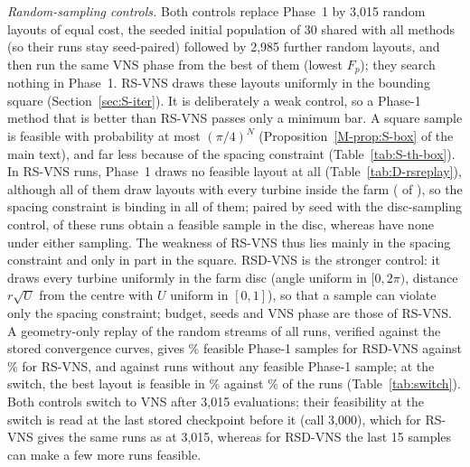 \documentclass[10pt]{article}
\begin{document}
\emph{Random-sampling controls.} Both controls replace Phase~1 by 3,015 random layouts of equal cost, the seeded initial population of 30 shared with all methods (so their runs stay seed-paired) followed by 2,985 further random layouts, and then run the same VNS phase from the best of them (lowest $F_p$); they search nothing in Phase~1. RS-VNS draws these layouts uniformly in the bounding square (Section~\ref{sec:S-iter}). It is deliberately a weak control, so a Phase-1 method that is better than RS-VNS passes only a minimum bar. A square sample is feasible with probability at most $(\pi/4)^N$ (Proposition~\ref{M-prop:S-box} of the main text), and far less because of the spacing constraint (Table~\ref{tab:S-th-box}). In \NRSRunsNoFeasSample{} RS-VNS runs, Phase~1 draws no feasible layout at all (Table~\ref{tab:D-rsreplay}), although all of them draw layouts with every turbine inside the farm (\NRsNoFeasInside{} of \NRSRunsNoFeasSample), so the spacing constraint is binding in all of them; paired by seed with the disc-sampling control, \NRsSquareExplains{} of these runs obtain a feasible sample in the disc, whereas \NRsSpacingDominates{} have none under either sampling. The weakness of RS-VNS thus lies mainly in the spacing constraint and only in part in the square. %
 RSD-VNS is the stronger control: it draws every turbine uniformly in the farm disc (angle uniform in $[0,2\pi)$, distance $r\sqrt{U}$ from the centre with $U$ uniform in $[0,1]$), so that a sample can violate only the spacing constraint; budget, seeds and VNS phase are those of RS-VNS. A geometry-only replay of the random streams of all runs, verified against the stored convergence curves, gives \NRSDPctFeasSamples\% feasible Phase-1 samples for RSD-VNS against \NRSPctFeasSamples\% for RS-VNS, and \NRSDRunsNoFeasSample{} against \NRSRunsNoFeasSample{} runs without any feasible Phase-1 sample; at the switch, the best layout is feasible in \NSwitchFeasRSDVNS\% against \NSwitchFeasRSVNS\% of the runs (Table~\ref{tab:switch}). Both controls switch to VNS after 3,015 evaluations; their feasibility at the switch is read at the last stored checkpoint before it (call 3,000), which for RS-VNS gives the same runs as at 3,015, whereas for RSD-VNS the last 15 samples can make a few more runs feasible. %
\end{document}
